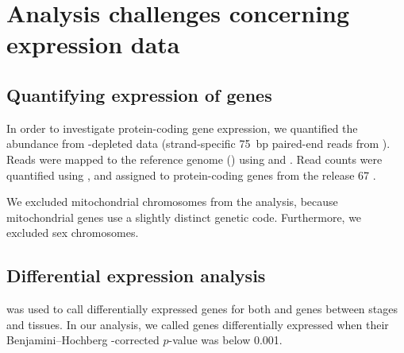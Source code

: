 \chapter{Analysis challenges concerning  expression data}
\label{sec:trna-analysis}

\section{Quantifying expression of \mrna genes}

In order to investigate protein-coding gene expression, we quantified the \mrna
abundance from \rrna-depleted \rnaseq data (strand-specific \SI{75}{bp}
paired-end reads from  ). Reads were mapped to
the \mmu reference genome () using 
\citep{Fonseca:2014} and  \citep{Kim:2013}. Read counts were
quantified using  \citep{Anders:2014}, and assigned to
protein-coding genes from the  release \num{67}
\citep{Flicek:2014}.

We excluded mitochondrial chromosomes from the analysis, because mitochondrial
genes use a slightly distinct genetic code. Furthermore, we excluded
sex chromosomes.

%
%
%

\section{Differential expression analysis}

 \citep{Love:2014} was used to call differentially expressed genes
for both \mrna and \trna genes between stages and tissues. In our analysis, we
called genes differentially expressed when their Benjamini–Hochberg
\fdr-corrected \(p\)-value was below \num{0.001}.

